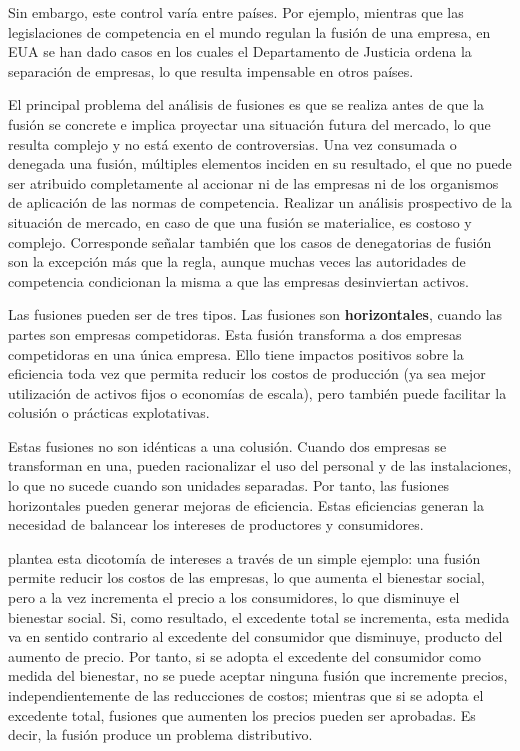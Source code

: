 \documentclass[
  12pt,
  spanish,
]{book}
\begin{document}
Sin embargo, este control varía entre países. Por ejemplo, mientras que
las legislaciones de competencia en el mundo regulan la fusión de una
empresa, en EUA se han dado casos en los cuales el Departamento de
Justicia ordena la separación de empresas, lo que resulta impensable en
otros países.

El principal problema del análisis de fusiones es que se realiza antes
de que la fusión se concrete e implica proyectar una situación futura
del mercado, lo que resulta complejo y no está exento de controversias.
Una vez consumada o denegada una fusión, múltiples elementos inciden en
su resultado, el que no puede ser atribuido completamente al accionar ni
de las empresas ni de los organismos de aplicación de las normas de
competencia. Realizar un análisis prospectivo de la situación de
mercado, en caso de que una fusión se materialice, es costoso y
complejo. Corresponde señalar también que los casos de denegatorias de
fusión son la excepción más que la regla, aunque muchas veces las
autoridades de competencia condicionan la misma a que las empresas
desinviertan activos.

Las fusiones pueden ser de tres tipos. Las fusiones son
\textbf{horizontales}, cuando las partes son empresas competidoras. Esta
fusión transforma a dos empresas competidoras en una única empresa. Ello
tiene impactos positivos sobre la eficiencia toda vez que permita
reducir los costos de producción (ya sea mejor utilización de activos
fijos o economías de escala), pero también puede facilitar la colusión o
prácticas explotativas.

Estas fusiones no son idénticas a una colusión. Cuando dos empresas se
transforman en una, pueden racionalizar el uso del personal y de las
instalaciones, lo que no sucede cuando son unidades separadas. Por
tanto, las fusiones horizontales pueden generar mejoras de eficiencia.
Estas eficiencias generan la necesidad de balancear los intereses de
productores y consumidores.

\citet{Williamson1968} plantea esta dicotomía de intereses a través de
un simple ejemplo: una fusión permite reducir los costos de las
empresas, lo que aumenta el bienestar social, pero a la vez incrementa
el precio a los consumidores, lo que disminuye el bienestar social. Si,
como resultado, el excedente total se incrementa, esta medida va en
sentido contrario al excedente del consumidor que disminuye, producto
del aumento de precio. Por tanto, si se adopta el excedente del
consumidor como medida del bienestar, no se puede aceptar ninguna fusión
que incremente precios, independientemente de las reducciones de costos;
mientras que si se adopta el excedente total, fusiones que aumenten los
precios pueden ser aprobadas. Es decir, la fusión produce un problema
distributivo.
\end{document}
